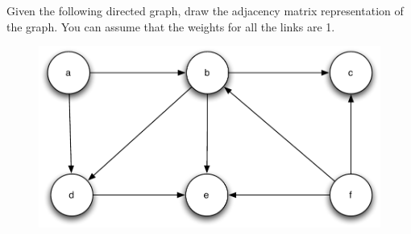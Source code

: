 \documentclass[11pt]{exam}
\begin{document}
\begin{questions}
\question[10] Given the following directed graph, draw the adjacency matrix representation of the graph.  You can assume that the weights for all the links are 1.
\begin{figure}[h!t]
        \begin{center}
        \includegraphics[scale=.75]{dfs}
    \end{center}
\end{figure}

\end{questions}
\end{document}
